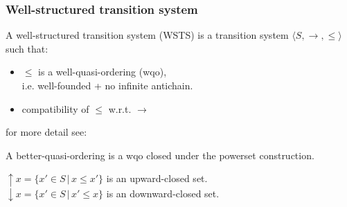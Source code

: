 \documentclass{beamer}
\begin{document}
\begin{frame}
  \frametitle{Well-structured transition system}
  A well-structured transition system (WSTS)
  is a transition system $\langle S, \rightarrow, \leq \rangle$ such that:
  \begin{itemize}
  \item
    $\leq$ is a well-quasi-ordering (wqo),\\
    i.e. well-founded + no infinite antichain.
  \item
    compatibility of $\leq$ w.r.t. $\rightarrow$\\
    \begin{center}
    \end{center}
  \end{itemize}

  for more detail see: \cite{DBLP:journals/tcs/FinkelS01, DBLP:conf/lics/AbdullaCJT96}

  \vspace{5pt}

  A better-quasi-ordering is a wqo closed under the powerset construction.

  \vspace{5pt}
  
  $\uparrow x = \{ x' \in S \,|\, x \leq x' \}$ is an upward-closed set.\\
  $\downarrow x = \{ x' \in S \,|\, x' \leq x \}$ is an downward-closed set.
\end{frame}
\end{document}

